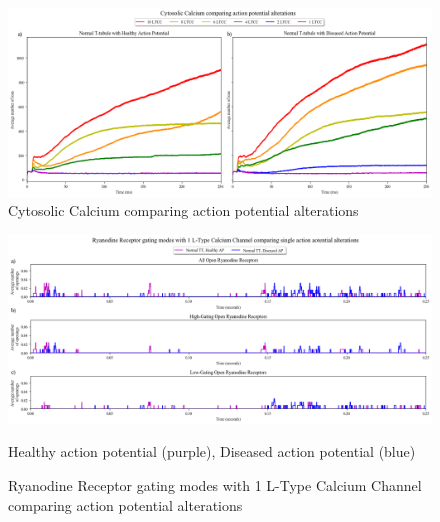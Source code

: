 \documentclass[12pt]{ucsddissertation}
\begin{document}
\setcounter{figure}{8}
\begin{figure}
\centering
	\includegraphics[scale=0.42]{cytCa_hnhd_Comparison.png}
	\caption{Cytosolic Calcium comparing action potential alterations}
	\label{fig:hnhd Calcium}
\end{figure}




\setcounter{figure}{9}
\begin{figure}
\centering
	\includegraphics[scale=0.4]{hnhd1RyR_r_1AP_Comparison.png}
	\caption{Ryanodine Receptor gating modes with 1 L-Type Calcium Channel comparing action potential alterations}Healthy action potential (purple), Diseased action potential (blue)
\label{fig:hnhd 1 LTCC 1 AP RyR} 
\end{figure}
\end{document}
